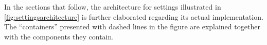 In the sections that follow, the architecture for settings illustrated in \cref{fig:settingsarchitecture} is further elaborated regarding its actual implementation.
The ``containers'' presented with dashed lines in the figure are explained together with the components they contain.